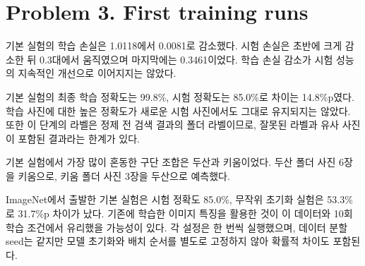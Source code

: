 \documentclass[11pt]{article}
\begin{document}
\section*{Problem 3. First training runs}

\begin{center}\footnotesize
{}
\end{center}


기본 실험의 학습 손실은 1.0118에서 0.0081로 감소했다. 시험 손실은 초반에 크게 감소한 뒤 0.3대에서 움직였으며 마지막에는 0.3461이었다. 학습 손실 감소가 시험 성능의 지속적인 개선으로 이어지지는 않았다.

기본 실험의 최종 학습 정확도는 99.8\%, 시험 정확도는 85.0\%로 차이는 14.8\%p였다. 학습 사진에 대한 높은 정확도가 새로운 시험 사진에서도 그대로 유지되지는 않았다. 또한 이 단계의 라벨은 정제 전 검색 결과의 폴더 라벨이므로, 잘못된 라벨과 유사 사진이 포함된 결과라는 한계가 있다.

\begin{center}\end{center}

기본 실험에서 가장 많이 혼동한 구단 조합은 두산과 키움이었다. 두산 폴더 사진 6장을 키움으로, 키움 폴더 사진 3장을 두산으로 예측했다.

ImageNet에서 출발한 기본 실험은 시험 정확도 85.0\%, 무작위 초기화 실험은 53.3\%로 31.7\%p 차이가 났다. 기존에 학습한 이미지 특징을 활용한 것이 이 데이터와 10회 학습 조건에서 유리했을 가능성이 있다. 각 설정은 한 번씩 실행했으며, 데이터 분할 seed는 같지만 모델 초기화와 배치 순서를 별도로 고정하지 않아 확률적 차이도 포함된다.
\end{document}
